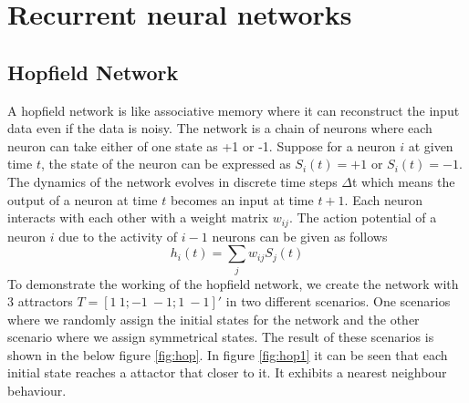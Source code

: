 \chapter{Recurrent neural networks}
\section{Hopfield Network}
A hopfield network is like associative memory where it can reconstruct the input data even if the data is noisy. The network is a chain of neurons where each neuron can take either of one state as +1 or -1. Suppose for a neuron $i$ at given time $t$, the state of the neuron can be expressed as $S_i(t) = +1 $ or $S_i(t) = -1 $. The dynamics of the network evolves in discrete time steps $\Delta$t which means the output of a neuron at time $t$ becomes an input at time $t+1$. Each neuron interacts with each other with a weight matrix $w_{ij}$. The action potential of a neuron $i$ due to the activity of $i-1$ neurons can be given as follows
\begin{equation}
h_i(t) = \sum_{j}w_{ij}S_j(t)
\end{equation}
To demonstrate the working of the hopfield network, we create the network with 3 attractors $T=[1 \ 1;-1 \ -1;1 \ -1]'$ in two different scenarios. One scenarios where we randomly assign the initial states for the network and the other scenario where we assign symmetrical states. The result of these scenarios is shown in the below figure \ref{fig:hop}. In figure \ref{fig:hop1} it can be seen that each initial state reaches a attactor that closer to it. It exhibits a nearest neighbour behaviour. \\
